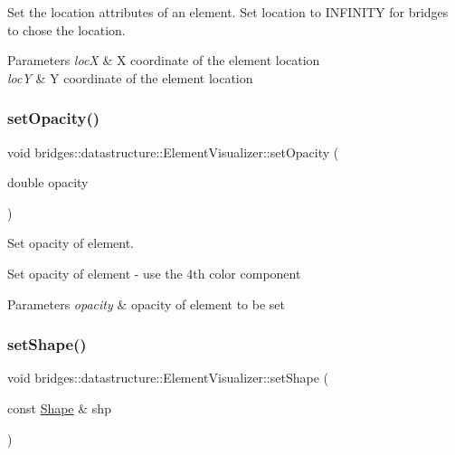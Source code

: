 Set the location attributes of an element. Set location to I\+N\+F\+I\+N\+I\+TY for bridges to chose the location.


\begin{DoxyParams}{Parameters}
{\em locX} & X coordinate of the element location \\
\hline
{\em locY} & Y coordinate of the element location \\
\hline
\end{DoxyParams}
\mbox{\label{classbridges_1_1datastructure_1_1_element_visualizer_a03f0ba203affb77d4ba8d2f1a6b1eea0}} 
\subsubsection{\texorpdfstring{set\+Opacity()}{setOpacity()}}
{\footnotesize\ttfamily void bridges\+::datastructure\+::\+Element\+Visualizer\+::set\+Opacity (\begin{DoxyParamCaption}\item[{double}]{opacity }\end{DoxyParamCaption})\hspace{0.3cm}{\ttfamily [inline]}}



Set opacity of element. 

Set opacity of element -\/ use the 4th color component


\begin{DoxyParams}{Parameters}
{\em opacity} & opacity of element to be set \\
\hline
\end{DoxyParams}
\mbox{\label{classbridges_1_1datastructure_1_1_element_visualizer_a316cccfc1e75ccbfdfe6d68da824b8b3}} 
\subsubsection{\texorpdfstring{set\+Shape()}{setShape()}}
{\footnotesize\ttfamily void bridges\+::datastructure\+::\+Element\+Visualizer\+::set\+Shape (\begin{DoxyParamCaption}\item[{const \hyperlink{namespacebridges_1_1datastructure_a3408f5f44d9c6062e5f3adb7e1bbb7f0}{Shape} \&}]{shp }\end{DoxyParamCaption})\hspace{0.3cm}{\ttfamily [inline]}}



